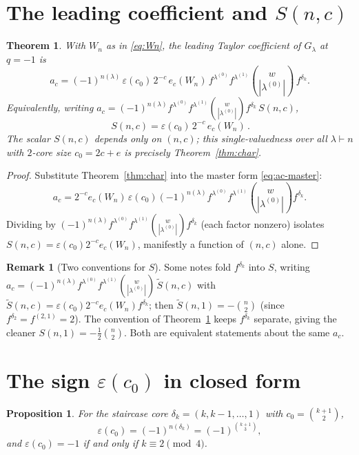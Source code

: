 \documentclass[11pt]{article}
\newtheorem{theorem}{Theorem}
\newtheorem{proposition}{Proposition}
\theoremstyle{definition}
\newtheorem{remark}{Remark}
\newcommand{\la}{\lambda}
\begin{document}
\section{The leading coefficient and $S(n,c)$}\label{sec:Snc}

\begin{theorem}\label{thm:Snc}
With $W_n$ as in \eqref{eq:Wn}, the leading Taylor coefficient of $G_\la$ at
$q=-1$ is
\[
  a_c=(-1)^{n(\la)}\,\varepsilon(c_0)\,2^{-c}\,e_c(W_n)\,
       f^{\la^{(0)}}f^{\la^{(1)}}\binom{w}{|\la^{(0)}|}\,f^{\delta_k}.
\]
Equivalently, writing
$a_c=(-1)^{n(\la)}f^{\la^{(0)}}f^{\la^{(1)}}\binom{w}{|\la^{(0)}|}f^{\delta_k}\,S(n,c)$,
\[
  \boxed{\,S(n,c)=\varepsilon(c_0)\,2^{-c}\,e_c(W_n)\,}.
\]
The scalar $S(n,c)$ depends only on $(n,c)$; this single-valuedness over all
$\la\vdash n$ with $2$-core size $c_0=2c+e$ is precisely Theorem~\ref{thm:char}.
\end{theorem}

\begin{proof}
Substitute Theorem~\ref{thm:char} into the master form \eqref{eq:ac-master}:
\[
  a_c=2^{-c}e_c(W_n)\,
      \varepsilon(c_0)(-1)^{n(\la)}f^{\la^{(0)}}f^{\la^{(1)}}
      \binom{w}{|\la^{(0)}|}f^{\delta_k}.
\]
Dividing by
$(-1)^{n(\la)}f^{\la^{(0)}}f^{\la^{(1)}}\binom{w}{|\la^{(0)}|}f^{\delta_k}$ (each
factor nonzero) isolates $S(n,c)=\varepsilon(c_0)2^{-c}e_c(W_n)$, manifestly a
function of $(n,c)$ alone.
\end{proof}

\begin{remark}[Two conventions for $S$]
Some notes fold $f^{\delta_k}$ into $S$, writing
$a_c=(-1)^{n(\la)}f^{\la^{(0)}}f^{\la^{(1)}}\binom{w}{|\la^{(0)}|}\,\widetilde
S(n,c)$ with $\widetilde S(n,c)=\varepsilon(c_0)2^{-c}e_c(W_n)f^{\delta_k}$; then
$\widetilde S(n,1)=-\binom n2$ (since $f^{\delta_2}=f^{(2,1)}=2$). The convention
of Theorem~\ref{thm:Snc} keeps $f^{\delta_k}$ separate, giving the cleaner
$S(n,1)=-\tfrac12\binom n2$. Both are equivalent statements about the same
$a_c$.
\end{remark}

\section{The sign $\varepsilon(c_0)$ in closed form}\label{sec:sign}

\begin{proposition}\label{prop:sign}
For the staircase core $\delta_k=(k,k-1,\dots,1)$ with $c_0=\binom{k+1}{2}$,
\[
  \varepsilon(c_0)=(-1)^{n(\delta_k)}=(-1)^{\binom{k+1}{3}},
\]
and $\varepsilon(c_0)=-1$ if and only if $k\equiv 2\pmod 4$.
\end{proposition}
\end{document}

